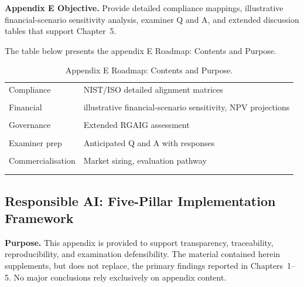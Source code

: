 


\noindent\textbf{Appendix E Objective.} Provide detailed compliance mappings, illustrative financial-scenario sensitivity analysis, examiner Q and A, and extended discussion tables that support Chapter~5.

\noindent The table below presents the appendix E Roadmap: Contents and Purpose.

\begin{table}[H]
\centering
\caption{Appendix E Roadmap: Contents and Purpose.}
\tablestripes\tablefontsize
\begin{tabularx}{\textwidth}{@{} >{\raggedright\arraybackslash}p{3.0cm} L @{}}
\toprule
{} &  \\
\midrule
Compliance & NIST/ISO detailed alignment matrices \\\\\addlinespace
Financial & illustrative financial-scenario sensitivity, NPV projections \\\\\addlinespace
Governance & Extended RGAIG assessment \\\\\addlinespace
Examiner prep & Anticipated Q and A with responses \\\\\addlinespace
Commercialisation & Market sizing, evaluation pathway \\\\\addlinespace
\bottomrule
\end{tabularx}
\end{table}


\subsection{Responsible AI: Five-Pillar Implementation Framework}


\noindent\textbf{Purpose.} This appendix is provided to support transparency, traceability, reproducibility, and examination defensibility. The material contained herein supplements, but does not replace, the primary findings reported in Chapters~1--5. No major conclusions rely exclusively on appendix content.

